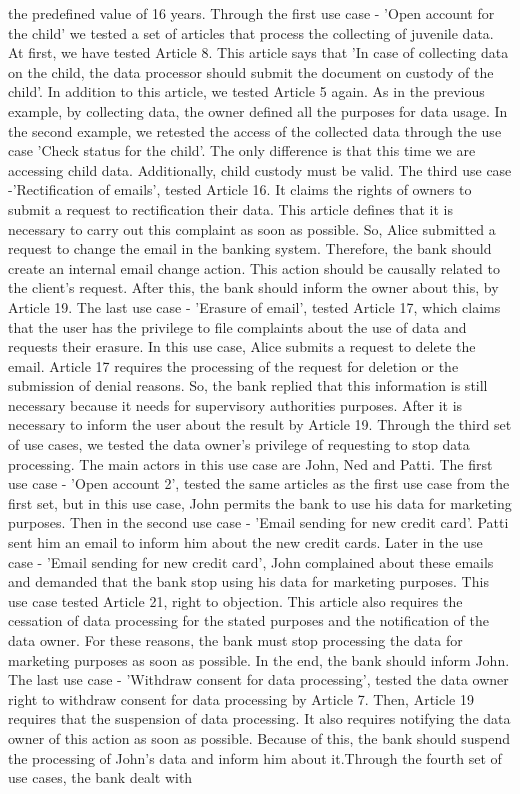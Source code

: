 \documentclass[11pt,english]{article}
\begin{document}
the predefined value of 16 years. Through the first use case - 'Open account for the child' we tested a set of articles that process the collecting of juvenile data. At first, we have tested Article 8. This article says that 'In case of collecting data on the child, the data processor should submit the document on custody of the child'. In addition to this article, we tested Article 5 again. As in the previous example, by collecting data, the owner defined all the purposes for data usage. In the second example, we retested the access of the collected data through the use case 'Check status for the child'. The only difference is that this time we are accessing child data. Additionally, child custody must be valid. The third use case -'Rectification of emails', tested Article 16. It claims the rights of owners to submit a request to rectification their data. This article defines that it is necessary to carry out this complaint as soon as possible. So, Alice submitted a request to change the email in the banking system. Therefore, the bank should create an internal email change action. This action should be causally related to the client's request. After this, the bank should inform the owner about this, by Article 19. The last use case - 'Erasure of email', tested Article 17, which claims that the user has the privilege to file complaints about the use of data and requests their erasure. In this use case, Alice submits a request to delete the email. Article 17 requires the processing of the request for deletion or the submission of denial reasons. So, the bank replied that this information is still necessary because it needs for supervisory authorities purposes. After it is necessary to inform the user about the result by Article 19. \newline Through the third set of use cases, we tested the data owner's privilege of requesting to stop data processing. The main actors in this use case are John, Ned and Patti. The first use case - 'Open account 2', tested the same articles as the first use case from the first set, but in this use case, John permits the bank to use his data for marketing purposes. Then in the second use case - 'Email sending for new credit card'. Patti sent him an email to inform him about the new credit cards. Later in the use case - 'Email sending for new credit card', John complained about these emails and demanded that the bank stop using his data for marketing purposes. This use case tested Article 21, right to objection. This article also requires the cessation of data processing for the stated purposes and the notification of the data owner. For these reasons, the bank must stop processing the data for marketing purposes as soon as possible. In the end, the bank should inform John. The last use case - 'Withdraw consent for data processing', tested the data owner right to withdraw consent for data processing by Article 7. Then, Article 19 requires that the suspension of data processing. It also requires notifying the data owner of this action as soon as possible. Because of this, the bank should suspend the processing of John's data and inform him about it.\newline Through the fourth set of use cases, the bank dealt with 
\end{document}
